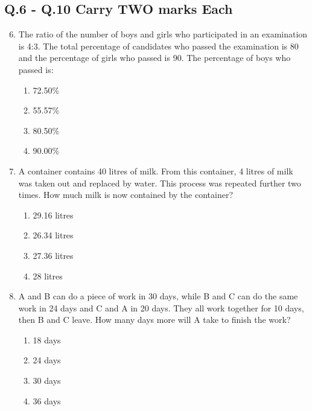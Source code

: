 \documentclass[a4paper,10pt]{article}
\begin{document}
\subsection*{Q.6 - Q.10 Carry TWO marks Each}
\begin{enumerate}
    \setcounter{enumi}{5}
    \item The ratio of the number of boys and girls who participated in an examination is 4:3. The total percentage of candidates who passed the examination is 80 and the percentage of girls who passed is 90. The percentage of boys who passed is:
    \begin{multicols}{4}
    \begin{enumerate}
        \item 72.50\%
        \item 55.57\%
        \item 80.50\%
        \item 90.00\%
    \end{enumerate}
    \end{multicols}

    \item A container contains 40 litres of milk. From this container, 4 litres of milk was taken out and replaced by water. This process was repeated further two times. How much milk is now contained by the container?
    \begin{multicols}{4}
    \begin{enumerate}
        \item 29.16 litres
        \item 26.34 litres
        \item 27.36 litres
        \item 28 litres
    \end{enumerate}
    \end{multicols}
    
    \item A and B can do a piece of work in 30 days, while B and C can do the same work in 24 days and C and A in 20 days. They all work together for 10 days, then B and C leave. How many days more will A take to finish the work?
    \begin{multicols}{4}
    \begin{enumerate}
        \item 18 days
        \item 24 days
        \item 30 days
        \item 36 days
    \end{enumerate}
    \end{multicols}
    

\end{enumerate}
\end{document}
